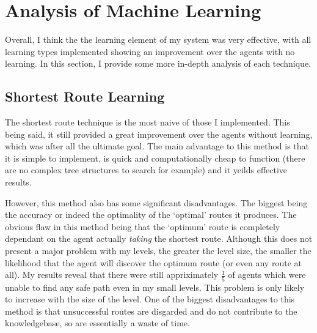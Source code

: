 \documentclass[a4paper,oneside]{report}
\begin{document}
\section{Analysis of Machine Learning}

Overall, I think the the learning element of my system was very effective, with all learning types implemented showing an improvement over the agents with no learning. In this section, I provide some more in-depth analysis of each technique.

\subsection{Shortest Route Learning}

The shortest route technique is the most naive of those I implemented. This being said, it still provided a great improvement over the agents without learning, which was after all the ultimate goal. The main advantage to this method is that it is simple to implement, is quick and computationally cheap to function (there are no complex tree structures to search for example) and it yeilds effective results. 

However, this method also has some significant disadvantages. The biggest being the accuracy or indeed the optimality of the `optimal' routes it produces. The obvious flaw in this method being that the `optimum' route is completely dependant on the agent actually \emph{taking} the shortest route. Although this does not present a major problem with my levels, the greater the level size, the smaller the likelihood that the agent will discover the optimum route (or even any route at all). My results reveal that there were still appriximately $\frac{1}{5}$ of agents which were unable to find any safe path even in my small levels. This problem is only likely to increase with the size of the level. One of the biggest disadvantages to this method is that unsuccessful routes are disgarded and do not contribute to the knowledgebase, so are essentially a waste of time. 
\end{document}
